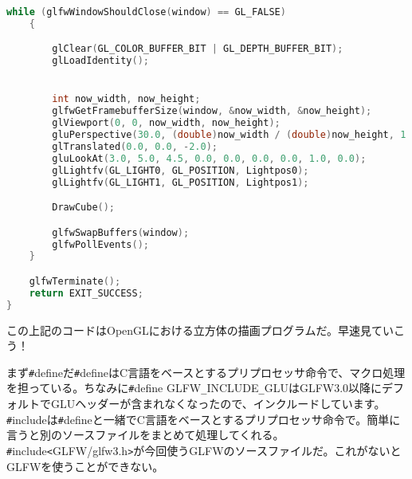 \documentclass[12pt,a4paper]{jsarticle}
\begin{document}
\begin{lstlisting}[language=C++]
	while (glfwWindowShouldClose(window) == GL_FALSE)
	{

		glClear(GL_COLOR_BUFFER_BIT | GL_DEPTH_BUFFER_BIT);
		glLoadIdentity();


		int now_width, now_height;
		glfwGetFramebufferSize(window, &now_width, &now_height);
		glViewport(0, 0, now_width, now_height);
		gluPerspective(30.0, (double)now_width / (double)now_height, 1.0, 100.0);
		glTranslated(0.0, 0.0, -2.0);
		gluLookAt(3.0, 5.0, 4.5, 0.0, 0.0, 0.0, 0.0, 1.0, 0.0);
		glLightfv(GL_LIGHT0, GL_POSITION, Lightpos0);
		glLightfv(GL_LIGHT1, GL_POSITION, Lightpos1);

		DrawCube();

		glfwSwapBuffers(window);
		glfwPollEvents();
	}

	glfwTerminate();
	return EXIT_SUCCESS;
}
\end{lstlisting}

この上記のコードはOpenGLにおける立方体の描画プログラムだ。早速見ていこう！

まず\verb|#|defineだ\verb|#|defineはC言語をベースとするプリプロセッサ命令で、マクロ処理を担っている。ちなみに\verb|#|define GLFW\verb|_|INCLUDE\verb|_|GLUはGLFW3.0以降にデフォルトでGLUヘッダーが含まれなくなったので、インクルードしています。
\verb|#|includeは\verb|#|defineと一緒でC言語をベースとするプリプロセッサ命令で。簡単に言うと別のソースファイルをまとめて処理してくれる。
\verb|#|include\verb|<|GLFW/glfw3.h\verb|>|が今回使うGLFWのソースファイルだ。これがないとGLFWを使うことができない。
\end{document}
